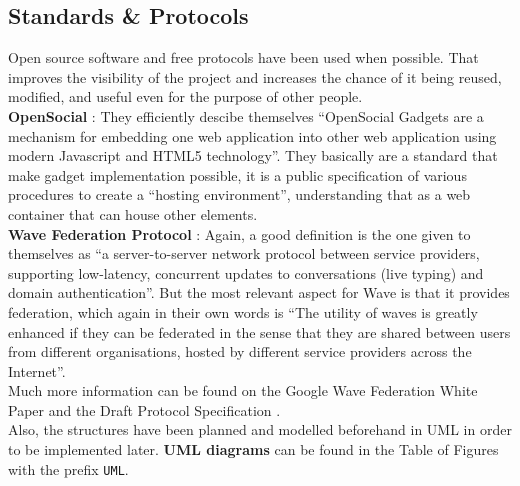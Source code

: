 \subsection{Standards \& Protocols}
Open source software and free protocols have been used when possible. That improves the visibility of the project and increases the chance of it being reused, modified, and useful even for the purpose of other people.\\[.2cm]
\textbf{OpenSocial} \cite{ref:opensocial}: They efficiently descibe themselves ``OpenSocial Gadgets are a mechanism for embedding one web application into other web application using modern Javascript and HTML5 technology''. They basically are a standard that make gadget implementation possible, it is a public specification of various procedures to create a ``hosting environment'', understanding that as a web container that can house other elements.\\[.2cm]
\textbf{Wave Federation Protocol} \cite{ref:wave_federation_protocol}: Again, a good definition is the one given to themselves as ``a server-to-server network protocol between service providers, supporting low-latency, concurrent updates to conversations (live typing) and domain authentication''. But the most relevant aspect for Wave is that it provides federation, which again in their own words is ``The utility of waves is greatly enhanced if they can be federated in the sense that they are shared between users from different organisations, hosted by different service providers across the Internet''.\\[.2cm]
Much more information can be found on the Google Wave Federation White Paper \cite{ref:wave_white_paper} and the Draft Protocol Specification \cite{ref:wave_over_xmpp}.\\[.2cm]
Also, the structures have been planned and modelled beforehand in UML \cite{ref:uml} in order to be implemented later. \textbf{UML diagrams} can be found in the Table of Figures with the prefix \verb|UML|.
